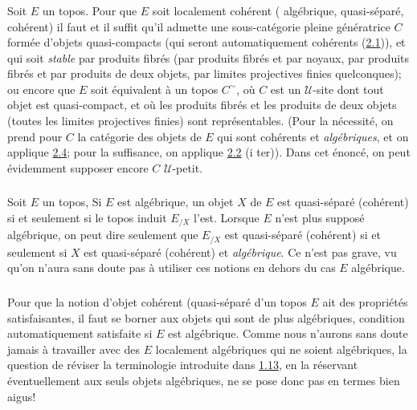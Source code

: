 \documentclass[10pt]{../fichiers-configuration-latex/smfart}
\begin{document}
\subsubsection{}
Soit $E$ un topos. Pour que $E$ soit localement cohérent (\resp
algébrique, \resp quasi-séparé, \resp cohérent) il faut et il suffit
qu'il admette une sous-catégorie pleine génératrice $C$ formée
d'objets quasi-compacts (qui seront automatiquement cohérents
(\hyperref[VI.prop2.1]{2.1})), et qui soit \emph{stable} par produits fibrés
(\resp par produits fibrés et par noyaux, \resp par produits fibrés
et par produits de deux objets, \resp par limites projectives finies
quelconques); ou encore que $E$ soit équivalent à un topos
$C^{\sim}$, où $C$ est un $𝒰$-site dont tout objet est
quasi-compact, et où les produits fibrés et les produits de deux
objets (\resp toutes les limites projectives finies) sont
représentables. (Pour la nécessité, on prend \pageoriginale pour $C$
la catégorie des objets de $E$ qui sont cohérents et
\emph{algébriques}, et on applique \hyperref[VI.subsec2.4]{2.4}; pour la
suffisance, on applique \hyperref[VI.prop2.2]{2.2} (i ter)). Dans cet énoncé,
on peut évidemment supposer encore $C$ $𝒰$-petit.

\subsubsection{}
Soit $E$ un topos, Si $E$ est algébrique, un objet $X$ de $E$ est
quasi-séparé (\resp cohérent) si et seulement si le topos induit
$E_{/X}$ l'est. Lorsque $E$ n'est plus supposé algébrique, on peut
dire seulement que $E_{/X}$ est quasi-séparé (\resp cohérent) si et
seulement si $X$ est quasi-séparé (\resp cohérent) et
\emph{algébrique}. Ce n'est pas grave, vu qu'on n'aura sans doute pas
à utiliser ces notions en dehors du cas $E$ algébrique.

\subsubsection{}
Pour que la notion d'objet cohérent (\resp quasi-séparé d'un
topos $E$ ait des propriétés satisfaisantes, il faut se borner aux
objets qui sont de plus algébriques, condition automatiquement
satisfaite si $E$ est algébrique. Comme nous n'aurons sans doute
jamais à travailler avec des $E$ localement algébriques qui ne soient
algébriques, la question de réviser la terminologie introduite dans
\hyperref[VI.def1.13]{1.13}, en la réservant éventuellement aux seuls objets algébriques, ne
se pose donc pas en termes bien aigus!
\end{document}
